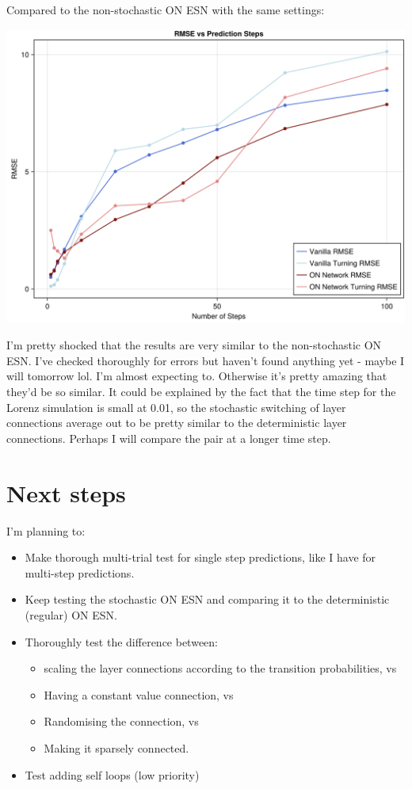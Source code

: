 \documentclass[a4paper,12pt]{article}
\begin{document}
\newpage

Compared to the non-stochastic ON ESN with the same settings:

\includegraphics[width=\textwidth]{figure_13.png}



I'm pretty shocked that the results are very similar to the non-stochastic ON ESN. I've checked thoroughly for errors but haven't found anything yet - maybe I will tomorrow lol. I'm almost expecting to. Otherwise it's pretty amazing that they'd be so similar. It could be explained by the fact that the time step for the Lorenz simulation is small at 0.01, so the stochastic switching of layer connections average out to be pretty similar to the deterministic layer connections. Perhaps I will compare the pair at a longer time step.


\newpage

\section{Next steps}

I'm planning to:

\begin{itemize}
    \item Make thorough multi-trial test for single step predictions, like I have for multi-step predictions.
    \item Keep testing the stochastic ON ESN and comparing it to the deterministic (regular) ON ESN.
    \item Thoroughly test the difference between:
    \begin{itemize}
        \item scaling the layer connections according to the transition probabilities, vs
        \item Having a constant value connection, vs
        \item Randomising the connection, vs
        \item Making it sparsely connected.
    \end{itemize}
    \item Test adding self loops (low priority)
\end{itemize}
\end{document}
